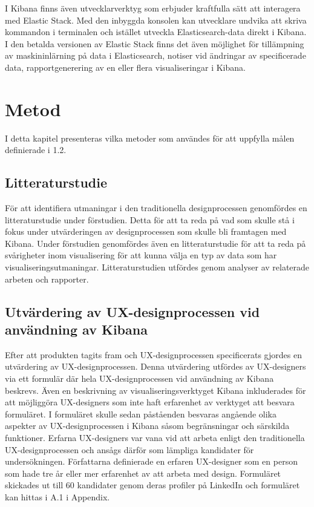 \documentclass[12pt]{kththesis}
\begin{document}
I Kibana finns även utvecklarverktyg som erbjuder kraftfulla sätt att interagera med Elastic Stack. Med den inbyggda konsolen kan utvecklare undvika att skriva kommandon i terminalen och istället utveckla Elasticsearch-data direkt i Kibana. I den betalda versionen av Elastic Stack finns det även möjlighet för tillämpning av maskininlärning på data i Elasticsearch, notiser vid ändringar av specificerade data, rapportgenerering av en eller flera visualiseringar i Kibana.

\afterpage{\null\newpage}
\chapter{Metod}

I detta kapitel presenteras vilka metoder som användes för att uppfylla målen definierade i 1.2.

\section{Litteraturstudie}

För att identifiera utmaningar i den traditionella designprocessen genomfördes en litteraturstudie under förstudien. Detta för att ta reda på vad som skulle stå i fokus under utvärderingen av designprocessen som skulle bli framtagen med Kibana. Under förstudien genomfördes även en litteraturstudie för att ta reda på svårigheter inom visualisering för att kunna välja en typ av data som har visualiseringsutmaningar. Litteraturstudien utfördes genom analyser av relaterade arbeten och rapporter.

\section{Utvärdering av UX-designprocessen vid användning av Kibana}

Efter att produkten tagits fram och UX-designprocessen specificerats gjordes en utvärdering av UX-designprocessen. Denna utvärdering utfördes av UX-designers via ett formulär där hela UX-designprocessen vid användning av Kibana beskrevs. Även en beskrivning av visualiseringsverktyget Kibana inkluderades för att möjliggöra UX-designers som inte haft erfarenhet av verktyget att besvara formuläret. I formuläret skulle sedan påståenden besvaras angående olika aspekter av UX-designprocessen i Kibana såsom begränsningar och särskilda funktioner. Erfarna UX-designers var vana vid att arbeta enligt den traditionella UX-designprocessen och ansågs därför som lämpliga kandidater för undersökningen. Författarna definierade en erfaren UX-designer som en person som hade tre år eller mer erfarenhet av att arbeta med design. Formuläret skickades ut till 60 kandidater genom deras profiler på LinkedIn och formuläret kan hittas i A.1 i Appendix.
\end{document}
